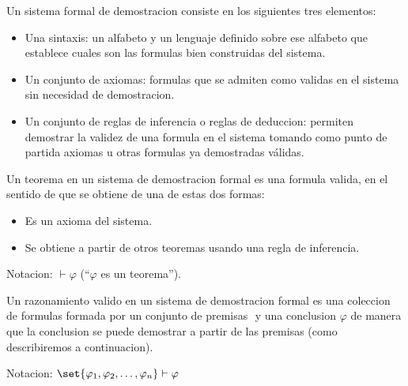 \begin{definition}
	Un sistema formal de demostracion consiste en los siguientes tres elementos:
	\begin{itemize}
		\item Una sintaxis: un alfabeto y un lenguaje definido sobre ese alfabeto que establece cuales son las formulas bien construidas del sistema.
		\item Un conjunto de axiomas: formulas que se admiten como validas en el sistema sin necesidad de demostracion.
		\item Un conjunto de reglas de inferencia o reglas de deduccion: permiten demostrar la validez de una formula en el sistema tomando como punto de partida axiomas u otras formulas ya demostradas válidas.
	\end{itemize}
\end{definition}

\begin{definition}[Teorema]
	Un teorema en un sistema de demostracion formal es una formula valida, en el sentido de que se obtiene de una de estas dos formas:
	\begin{itemize}
		\item Es un axioma del sistema.
		\item Se obtiene a partir de otros teoremas usando una regla de inferencia.
	\end{itemize}
	Notacion: \(\vdash \varphi\) (``\(\varphi\)  es un teorema'').
\end{definition}
\begin{definition}
	Un razonamiento valido en un sistema de demostracion formal es una coleccion de formulas formada por un conjunto de premisas \(\) y una conclusion \(\varphi \) de manera que la conclusion se puede demostrar a partir de las premisas (como describiremos a continuacion).

	Notacion: \(\set{\varphi_1, \varphi_2, \ldots, \varphi_n} \vdash \varphi\)
\end{definition}

